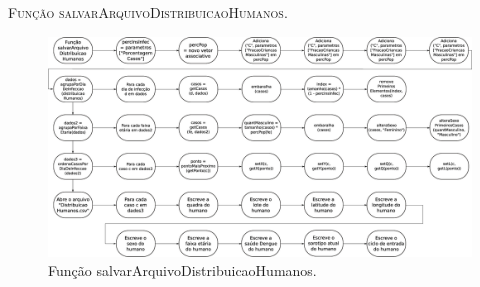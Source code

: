 

\begin{algorithm}[H]
   \SetAlgoLined   
   
   \caption{\textsc{Função salvarArquivoDistribuicaoHumanos.}}
   \label{alg:salvarArquivoDistribuicaoHumanos}
\end{algorithm}

\begin{figure}[H]
  \centering
  \includegraphics[width=1\textwidth]{Figuras/Simula/Fluxos/salvarArquivoDistribuicaoHumanos.eps}
  \caption{Função salvarArquivoDistribuicaoHumanos.}
  \label{fig:salvarArquivoDistribuicaoHumanos}
\end{figure} 

\newpage
